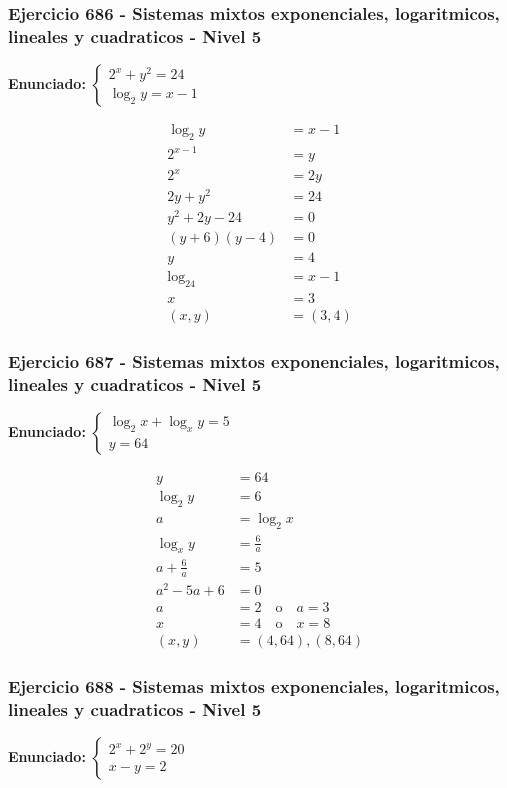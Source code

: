 \documentclass[12pt,a4paper]{article}
\begin{document}
\subsubsection*{Ejercicio 686 - Sistemas mixtos exponenciales, logaritmicos, lineales y cuadraticos - Nivel 5}
\textbf{Enunciado:} \(\begin{cases}2^x+y^2=24\\ \log_2y=x-1\end{cases}\)

\[
\begin{aligned}
\log_2y&=x-1\\
2^{x-1}&=y\\
2^x&=2y\\
2y+y^2&=24\\
y^2+2y-24&=0\\
(y+6)(y-4)&=0\\
y&=4\\
\log_24&=x-1\\
x&=3\\
(x,y)&=\boxed{(3,4)}
\end{aligned}
\]


\subsubsection*{Ejercicio 687 - Sistemas mixtos exponenciales, logaritmicos, lineales y cuadraticos - Nivel 5}
\textbf{Enunciado:} \(\begin{cases}\log_2x+\log_xy=5\\ y=64\end{cases}\)

\[
\begin{aligned}
y&=64\\
\log_2y&=6\\
a&=\log_2x\\
\log_xy&=\frac6a\\
a+\frac6a&=5\\
a^2-5a+6&=0\\
a&=2\quad \text{o}\quad a=3\\
x&=4\quad \text{o}\quad x=8\\
(x,y)&=\boxed{(4,64),(8,64)}
\end{aligned}
\]


\subsubsection*{Ejercicio 688 - Sistemas mixtos exponenciales, logaritmicos, lineales y cuadraticos - Nivel 5}
\textbf{Enunciado:} \(\begin{cases}2^x+2^y=20\\ x-y=2\end{cases}\)
\end{document}
